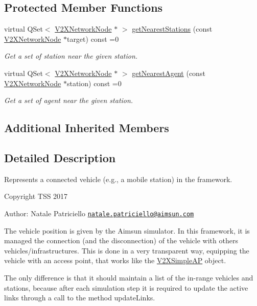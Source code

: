 \subsection*{Protected Member Functions}
\begin{DoxyCompactItemize}
\item 
virtual Q\+Set$<$ \hyperlink{classV2XNetworkNode}{V2\+X\+Network\+Node} $\ast$ $>$ \hyperlink{classV2XConnectedAgent_a409766a272c283572c6c441dcc881691}{get\+Nearest\+Stations} (const \hyperlink{classV2XNetworkNode}{V2\+X\+Network\+Node} $\ast$target) const =0
\begin{DoxyCompactList}\small\item\em Get a set of station near the given station. \end{DoxyCompactList}\item 
virtual Q\+Set$<$ \hyperlink{classV2XNetworkNode}{V2\+X\+Network\+Node} $\ast$ $>$ \hyperlink{classV2XConnectedAgent_a31b45665523ac20e2761a8fd046b2d54}{get\+Nearest\+Agent} (const \hyperlink{classV2XNetworkNode}{V2\+X\+Network\+Node} $\ast$station) const =0
\begin{DoxyCompactList}\small\item\em Get a set of agent near the given station. \end{DoxyCompactList}\end{DoxyCompactItemize}
\subsection*{Additional Inherited Members}


\subsection{Detailed Description}
Represents a connected vehicle (e.\+g., a mobile station) in the framework. 

Copyright T\+SS 2017

Author\+: Natale Patriciello \href{mailto:natale.patriciello@aimsun.com}{\tt natale.\+patriciello@aimsun.\+com}

The vehicle position is given by the Aimsun simulator. In this framework, it is managed the connection (and the disconnection) of the vehicle with others vehicles/infrastructures. This is done in a very transparent way, equipping the vehicle with an access point, that works like the \hyperlink{classV2XSimpleAP}{V2\+X\+Simple\+AP} object.

The only difference is that it should maintain a list of the in-\/range vehicles and stations, because after each simulation step it is required to update the active links through a call to the method update\+Links.

